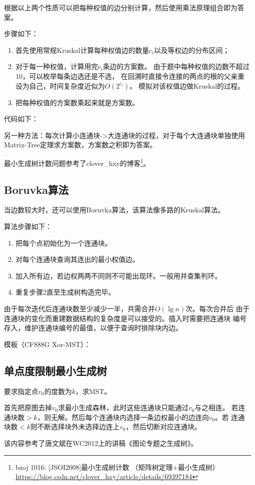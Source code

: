 根据以上两个性质可以把每种权值的边分别计算，然后使用乘法原理组合即为答案。

步骤如下：
\begin{enumerate}
	\item 首先使用常规Kruskal计算每种权值边的数量$c_i$以及等权边的分布区间；
	\item 对于每一种权值，计算用完$c_i$条边的方案数。
	      由于题中每种权值的边数不超过10，可以枚举每条边选还是不选，
          在回溯时直接令连接的两点的根的父亲重设为自己，时间复杂度近似为$O(2^{c_i})$。
          模拟对该权值边做Kruskal的过程。
	\item 把每种权值的方案数乘起来就是方案数。
\end{enumerate}

代码如下：


另一种方法：每次计算小连通块->大连通块的过程，对于每个大连通块单独使用
Matrix-Tree定理求方案数，方案数之积即为答案。

最小生成树计数问题参考了clover\_hxy的博客\footnote{
bzoj 1016: [JSOI2008]最小生成树计数 （矩阵树定理+最小生成树）
\url{https://blog.csdn.net/clover\_hxy/article/details/69397184}
}。
\subsection{Boruvka算法}
当边数较大时，还可以使用Boruvka算法，该算法像多路的Kruskal算法。

算法步骤如下：
\begin{enumerate}
    \item 把每个点初始化为一个连通块。
    \item 对每个连通块查询其连出的最小权值边。
    \item 加入所有边，若边权两两不同则不可能出现环。一般用并查集判环。
    \item 重复步骤2直至生成树构造完毕。
\end{enumerate}

由于每次迭代后连通块数至少减少一半，共需合并$O(\lg n)$次。每次合并后
由于连通块的变化而重建数据结构的复杂度是可以接受的。插入时需要把连通块
编号存入，维护连通块编号的最值，以便于查询时排除块内边。

模板（CF888G Xor-MST）：

\subsection{单点度限制最小生成树}
要求指定点$v_0$的度数为$k$，求MST。

首先把原图去掉$v_0$求最小生成森林，此时这些连通块只能通过$v_0$与之相连。
若连通块数$>k$，则无解。然后每个连通块内选择一条边权最小的边连向$v_0$。若
连通块数$<k$则不断选择块外未选择边连上$v_0$，然后切断对应连通块。

该内容参考了唐文斌在WC2012上的讲稿《图论专题之生成树》。
